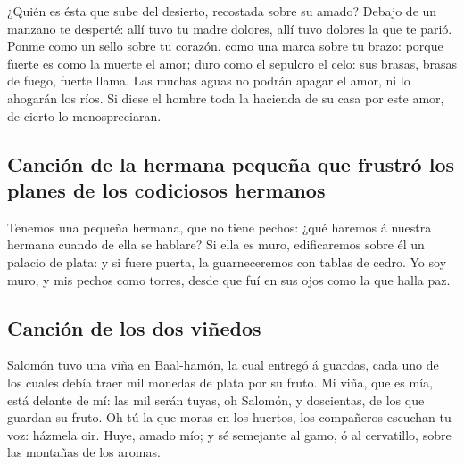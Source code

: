  ¿Quién es ésta que sube del desierto, recostada sobre su
amado? Debajo de un manzano te desperté: allí tuvo tu madre dolores,
allí tuvo dolores la que te parió.  Ponme como un sello
sobre tu corazón, como una marca sobre tu brazo: porque fuerte es como
la muerte el amor; duro como el sepulcro el celo: sus brasas, brasas de
fuego, fuerte llama.  Las muchas aguas no podrán apagar el
amor, ni lo ahogarán los ríos. Si diese el hombre toda la hacienda de su
casa por este amor, de cierto lo menospreciaran.

\hypertarget{canciuxf3n-de-la-hermana-pequeuxf1a-que-frustruxf3-los-planes-de-los-codiciosos-hermanos}{%
\subsection{Canción de la hermana pequeña que frustró los planes de los
codiciosos
hermanos}\label{canciuxf3n-de-la-hermana-pequeuxf1a-que-frustruxf3-los-planes-de-los-codiciosos-hermanos}}

 Tenemos una pequeña hermana, que no tiene pechos: ¿qué
haremos á nuestra hermana cuando de ella se hablare?  Si
ella es muro, edificaremos sobre él un palacio de plata: y si fuere
puerta, la guarneceremos con tablas de cedro.  Yo soy muro,
y mis pechos como torres, desde que fuí en sus ojos como la que halla
paz.

\hypertarget{canciuxf3n-de-los-dos-viuxf1edos}{%
\subsection{Canción de los dos
viñedos}\label{canciuxf3n-de-los-dos-viuxf1edos}}

 Salomón tuvo una viña en Baal-hamón, la cual entregó á
guardas, cada uno de los cuales debía traer mil monedas de plata por su
fruto.  Mi viña, que es mía, está delante de mí: las mil
serán tuyas, oh Salomón, y doscientas, de los que guardan su fruto.
 Oh tú la que moras en los huertos, los compañeros escuchan
tu voz: házmela oir.  Huye, amado mío; y sé semejante al
gamo, ó al cervatillo, sobre las montañas de los aromas.

